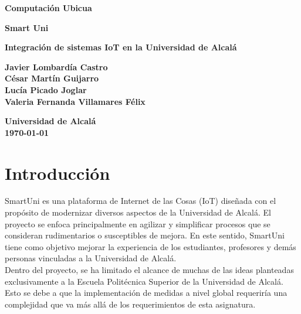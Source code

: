 \documentclass[12pt]{report}
\begin{document}
\begin{titlepage}
    \begin{center}
        \vspace*{1cm}
        
        \textbf{\huge Computación Ubicua}
        
        \vspace{0.5cm}
        \textbf{\large Smart Uni}
        
        \vspace{1.5cm}
        
        \textbf{\huge Integración de sistemas IoT en la Universidad de Alcalá}
        
        \vspace{2cm}
        
        \textbf{\large Javier Lombardía Castro}\\
        \textbf{\large César Martín Guijarro}\\
        \textbf{\large Lucía Picado Joglar }\\
        \textbf{\large Valeria Fernanda Villamares Félix}\\
        
        \vfill
        
        \textbf{\large Universidad de Alcalá}\\
        \textbf{\large \today}
        
    \end{center}
\end{titlepage}


\tableofcontents



\chapter{Introducción}
SmartUni es una plataforma de Internet de las Cosas (IoT) diseñada con el propósito de modernizar diversos aspectos de la Universidad de Alcalá. El proyecto se enfoca principalmente en agilizar y simplificar procesos que se consideran rudimentarios o susceptibles de mejora. En este sentido, SmartUni tiene como objetivo mejorar la experiencia de los estudiantes, profesores y demás personas vinculadas a la Universidad de Alcalá.
\\

Dentro del proyecto, se ha limitado el alcance de muchas de las ideas planteadas exclusivamente a la Escuela Politécnica Superior de la Universidad de Alcalá. Esto se debe a que la implementación de medidas a nivel global requeriría una complejidad que va más allá de los requerimientos de esta asignatura.
\\
\end{document}
